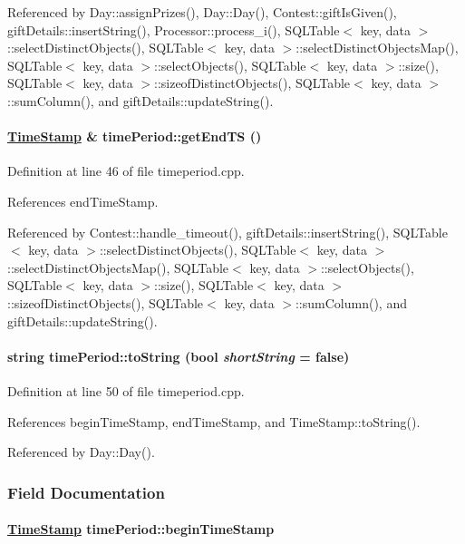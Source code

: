 Referenced by Day::assign\-Prizes(), Day::Day(), Contest::gift\-Is\-Given(), gift\-Details::insert\-String(), Processor::process\_\-i(), SQLTable$<$ key, data $>$::select\-Distinct\-Objects(), SQLTable$<$ key, data $>$::select\-Distinct\-Objects\-Map(), SQLTable$<$ key, data $>$::select\-Objects(), SQLTable$<$ key, data $>$::size(), SQLTable$<$ key, data $>$::sizeof\-Distinct\-Objects(), SQLTable$<$ key, data $>$::sum\-Column(), and gift\-Details::update\-String().\hypertarget{classtimePeriod_timePerioda5}{
\paragraph[getEndTS]{\setlength{\rightskip}{0pt plus 5cm}\hyperlink{classTimeStamp}{Time\-Stamp} \& time\-Period::get\-End\-TS ()}\hfill}
\label{classtimePeriod_timePerioda5}




Definition at line 46 of file timeperiod.cpp.

References end\-Time\-Stamp.

Referenced by Contest::handle\_\-timeout(), gift\-Details::insert\-String(), SQLTable$<$ key, data $>$::select\-Distinct\-Objects(), SQLTable$<$ key, data $>$::select\-Distinct\-Objects\-Map(), SQLTable$<$ key, data $>$::select\-Objects(), SQLTable$<$ key, data $>$::size(), SQLTable$<$ key, data $>$::sizeof\-Distinct\-Objects(), SQLTable$<$ key, data $>$::sum\-Column(), and gift\-Details::update\-String().\hypertarget{classtimePeriod_timePerioda8}{
\paragraph[toString]{\setlength{\rightskip}{0pt plus 5cm}string time\-Period::to\-String (bool {\em short\-String} = false)}\hfill}
\label{classtimePeriod_timePerioda8}




Definition at line 50 of file timeperiod.cpp.

References begin\-Time\-Stamp, end\-Time\-Stamp, and Time\-Stamp::to\-String().

Referenced by Day::Day().

\subsubsection{Field Documentation}
\hypertarget{classtimePeriod_timePeriodo0}{
\paragraph[beginTimeStamp]{\setlength{\rightskip}{0pt plus 5cm}\hyperlink{classTimeStamp}{Time\-Stamp} time\-Period::begin\-Time\-Stamp}\hfill}
\label{classtimePeriod_timePeriodo0}




